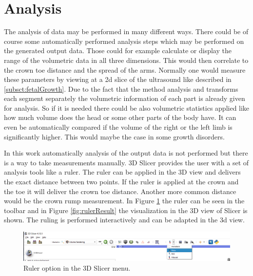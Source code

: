 \section{Analysis}
The analysis of data may be performed in many different ways. There could be of course some automatically performed analysis steps which may be performed on the generated output data. Those could for example calculate or display the range of the volumetric data in all three dimensions. This would then correlate to the crown toe distance and the spread of the arms. Normally one would measure these parameters by viewing at a \gls{2d} slice of the ultrasound like described in \ref{subsct:fetalGrowth}. Due to the fact that the method analysis and transforms each segment separately the volumetric information of each part is already given for analysis. So if it is needed there could be also volumetric statistics applied like how much volume does the head or some other parts of the body have. It can even be automatically compared if the volume of the right or the left limb is significantly higher. This would maybe the case in some growth disorders.

\newpage
In this work automatically analysis of the output data is not performed but there is a way to take measurements manually. 3D Slicer provides the user with a set of analysis tools like a ruler. The ruler can be applied in the 3D view and delivers the exact distance between two points. If the ruler is applied at the crown and the toe it will deliver the crown toe distance. Another more common distance would be the crown rump measurement. In Figure \ref{fig:ruler} the ruler can be seen in the toolbar and in Figure \ref{fig:rulerResult} the visualization in the 3D view of Slicer is shown. The ruling is performed interactively and can be adapted in the \gls{3d} view.\newline


\begin{figure} [!htb]
    \centering
	\includegraphics[width=14cm]{content/images/ruler.png}
	\caption{Ruler option in the 3D Slicer menu.} 
	\label{fig:ruler}
\end{figure}

